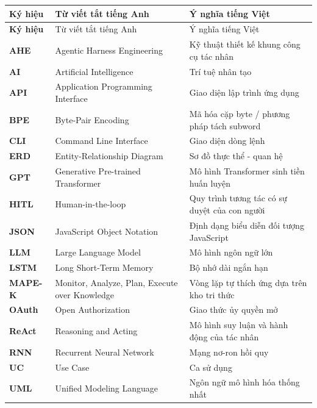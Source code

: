 \thispagestyle{empty}

\begingroup
\small
  \begin{longtable}{|>{\bfseries}p{2.0cm}|p{5.0cm}|p{6.3cm}|}
    \hline
    Ký hiệu & Từ viết tắt tiếng Anh & Ý nghĩa tiếng Việt \\
    \hline
    \endfirsthead
    \hline
    Ký hiệu & Từ viết tắt tiếng Anh & Ý nghĩa tiếng Việt \\
    \hline
    \endhead
    AHE & Agentic Harness Engineering & Kỹ thuật thiết kế khung công cụ tác nhân \\
    \hline
    AI & Artificial Intelligence & Trí tuệ nhân tạo \\
    \hline
    API & Application Programming Interface & Giao diện lập trình ứng dụng \\
    \hline
    BPE & Byte-Pair Encoding & Mã hóa cặp byte / phương pháp tách subword \\
    \hline
    CLI & Command Line Interface & Giao diện dòng lệnh \\
    \hline
    ERD & Entity-Relationship Diagram & Sơ đồ thực thể - quan hệ \\
    \hline
    GPT & Generative Pre-trained Transformer & Mô hình Transformer sinh tiền huấn luyện \\
    \hline
    HITL & Human-in-the-loop & Quy trình tương tác có sự duyệt của con người \\
    \hline
    JSON & JavaScript Object Notation & Định dạng biểu diễn đối tượng JavaScript \\
    \hline
    LLM & Large Language Model & Mô hình ngôn ngữ lớn \\
    \hline
    LSTM & Long Short-Term Memory & Bộ nhớ dài ngắn hạn \\
    \hline
    MAPE-K & Monitor, Analyze, Plan, Execute over Knowledge & Vòng lặp tự thích ứng dựa trên kho tri thức \\
    \hline
    OAuth & Open Authorization & Giao thức ủy quyền mở \\
    \hline
    ReAct & Reasoning and Acting & Mô hình suy luận và hành động của tác nhân \\
    \hline
    RNN & Recurrent Neural Network & Mạng nơ-ron hồi quy \\
    \hline
    UC & Use Case & Ca sử dụng \\
    \hline
    UML & Unified Modeling Language & Ngôn ngữ mô hình hóa thống nhất \\
    \hline
  \end{longtable}
\endgroup
